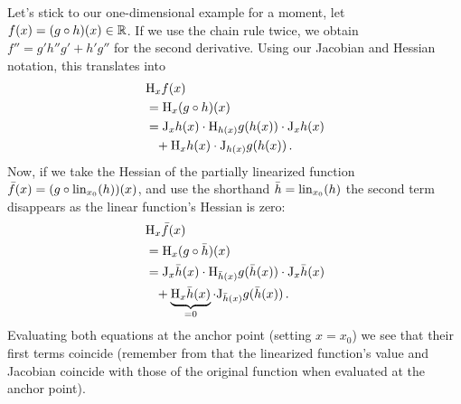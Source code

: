 Let's stick to our one-dimensional example for a moment, \ie let $f(x) = (g \circ h)(x) \in {\mathbb{R}}$.
If we use the chain rule twice, we obtain $f'' = g' h'' g' + h' g''$ for the second derivative. Using our Jacobian and Hessian notation, this translates into
\begin{align*}
  &\mathrm{H}_x f(x)
  \\
  &=\mathrm{H}_x (g \circ h)(x)
  \\
  &=\mathrm{J}_x h(x) \cdot \mathrm{H}_{h(x)} g(h(x)) \cdot \mathrm{J}_x h(x)
  \\
  &\phantom{= }+
    \mathrm{H}_x h(x) \cdot \mathrm{J}_{h(x)} g(h(x))\,.
\end{align*}
Now, if we take the Hessian of the partially linearized function $\bar{f}(x) = (g \circ \operatorname{lin}_{x_0}(h))(x)$, and use the shorthand $\bar{h} = \operatorname{lin}_{x_0}(h)$ the second term disappears as the linear function's Hessian is zero:
\begin{align*}
  &\mathrm{H}_x \bar{f}(x)
  \\
  &=\mathrm{H}_x (g \circ \bar{h})(x)
  \\
  &=\mathrm{J}_x \bar{h}(x) \cdot \mathrm{H}_{\bar{h}(x)} g(\bar{h}(x)) \cdot \mathrm{J}_x \bar{h}(x)
  \\
  &\phantom{= }+
    \underbrace{\mathrm{H}_x \bar{h}(x)}_{= 0} \cdot \mathrm{J}_{\bar{h}(x)} g(\bar{h}(x))\,.
\end{align*}
Evaluating both equations at the anchor point (setting $x = x_0$) we see that their first terms coincide (remember from  that the linearized function's value and Jacobian coincide with those of the original function when evaluated at the anchor point).

